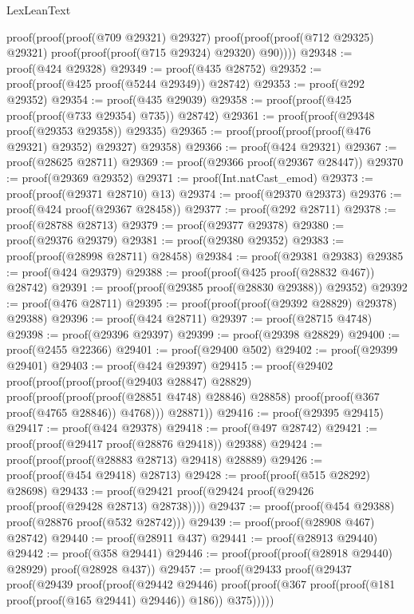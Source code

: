 \begin{lexlean}{LexLeanText}
\begin{coremodule}
      proof(proof(proof(@709 @29321) @29327)
          proof(proof(proof(@712 @29325) @29321) proof(proof(proof(@715 @29324) @29320) @90))))
@29348 := proof(@424 @29328)
@29349 := proof(@435 @28752)
@29352 := proof(proof(@425 proof(@5244 @29349)) @28742)
@29353 := proof(@292 @29352)
@29354 := proof(@435 @29039)
@29358 := proof(proof(@425 proof(proof(@733 @29354) @735)) @28742)
@29361 := proof(proof(@29348 proof(@29353 @29358)) @29335)
@29365 := proof(proof(proof(proof(@476 @29321) @29352) @29327) @29358)
@29366 := proof(@424 @29321)
@29367 := proof(@28625 @28711)
@29369 := proof(@29366 proof(@29367 @28447))
@29370 := proof(@29369 @29352)
@29371 := proof(Int.natCast_emod)
@29373 := proof(proof(@29371 @28710) @13)
@29374 := proof(@29370 @29373)
@29376 := proof(@424 proof(@29367 @28458))
@29377 := proof(@292 @28711)
@29378 := proof(@28788 @28713)
@29379 := proof(@29377 @29378)
@29380 := proof(@29376 @29379)
@29381 := proof(@29380 @29352)
@29383 := proof(proof(@28998 @28711) @28458)
@29384 := proof(@29381 @29383)
@29385 := proof(@424 @29379)
@29388 := proof(proof(@425 proof(@28832 @467)) @28742)
@29391 := proof(proof(@29385 proof(@28830 @29388)) @29352)
@29392 := proof(@476 @28711)
@29395 := proof(proof(proof(@29392 @28829) @29378) @29388)
@29396 := proof(@424 @28711)
@29397 := proof(@28715 @4748)
@29398 := proof(@29396 @29397)
@29399 := proof(@29398 @28829)
@29400 := proof(@2455 @22366)
@29401 := proof(@29400 @502)
@29402 := proof(@29399 @29401)
@29403 := proof(@424 @29397)
@29415 := proof(@29402
      proof(proof(proof(proof(@29403 @28847) @28829)
            proof(proof(proof(proof(@28851 @4748) @28846) @28858)
                proof(proof(@367 proof(@4765 @28846)) @4768)))
          @28871))
@29416 := proof(@29395 @29415)
@29417 := proof(@424 @29378)
@29418 := proof(@497 @28742)
@29421 := proof(proof(@29417 proof(@28876 @29418)) @29388)
@29424 := proof(proof(proof(@28883 @28713) @29418) @28889)
@29426 := proof(proof(@454 @29418) @28713)
@29428 := proof(proof(@515 @28292) @28698)
@29433 := proof(@29421 proof(@29424 proof(@29426 proof(proof(@29428 @28713) @28738))))
@29437 := proof(proof(@454 @29388) proof(@28876 proof(@532 @28742)))
@29439 := proof(proof(@28908 @467) @28742)
@29440 := proof(@28911 @437)
@29441 := proof(@28913 @29440)
@29442 := proof(@358 @29441)
@29446 := proof(proof(proof(@28918 @29440) @28929) proof(@28928 @437))
@29457 := proof(@29433
      proof(@29437
          proof(@29439
              proof(proof(@29442 @29446)
                  proof(proof(@367 proof(proof(@181 proof(proof(@165 @29441) @29446)) @186))
                      @375)))))

\end{coremodule}
\end{lexlean}
